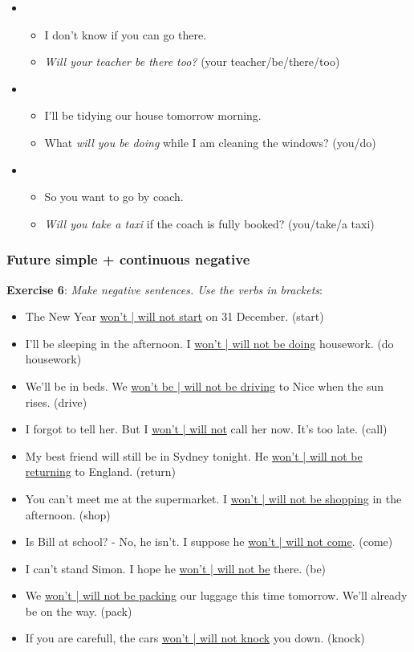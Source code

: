 \begin{itemize}
\item
\begin{itemize}
\item I don't know if you can go there. 
\item \textit{Will your teacher be there too?} (your teacher/be/there/too) 
\end{itemize}

\item
\begin{itemize}
\item I'll be tidying our house tomorrow morning.
\item What \textit{will you be doing} while I am cleaning the windows?  (you/do)
\end{itemize}

\item
\begin{itemize}
\item So you want to go by coach.
\item \textit{Will you take a taxi} if the coach is fully booked? (you/take/a taxi)
\end{itemize}

\end{itemize}

\subsubsection{Future simple + continuous negative}

\textbf{Exercise 6}: \textit{Make negative sentences. Use the verbs in brackets}:

\begin{itemize}

\item The New Year \underline{won't | will not start} on 31 December. (start)
\item I'll be sleeping in the afternoon. I \underline{won't | will not be doing} housework. (do housework)
\item We'll be in beds. We \underline{won't be | will not be driving} to Nice when the sun rises. (drive)
\item I forgot to tell her. But I \underline{won't | will not} call her now. It's too late. (call)
\item My best friend will still be in Sydney tonight. He \underline{won't | will not be returning} to England. (return)
\item You can't meet me at the supermarket. I \underline{won't | will not be shopping} in the afternoon. (shop)
\item Is Bill at school? - No, he isn't. I suppose he \underline{won't | will not come}. (come)
\item I can't stand Simon. I hope he \underline{won't | will not be} there. (be)
\item We \underline{won't | will not be packing} our luggage this time tomorrow. We'll already be on the way. (pack)
\item If you are carefull, the cars \underline{won't | will not knock} you down. (knock)

\end{itemize}

